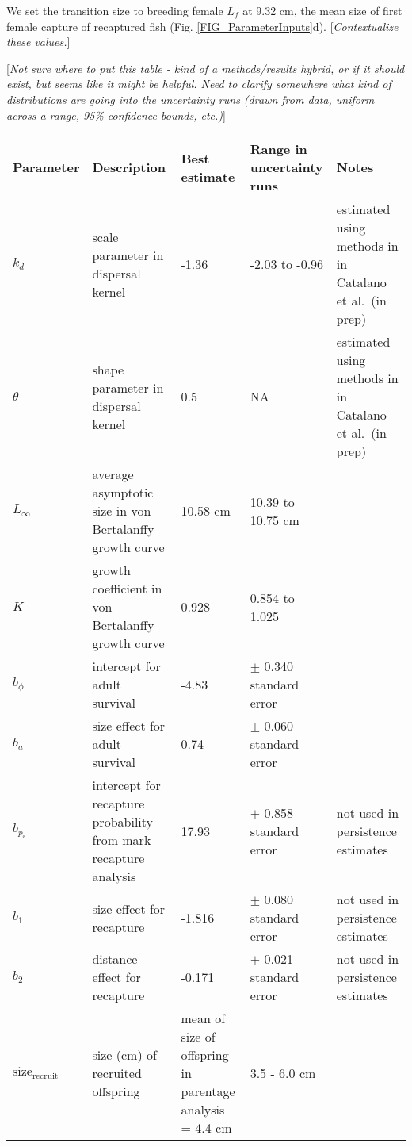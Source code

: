 \documentclass[12pt, oneside]{article}   	%
\begin{document}
We set the transition size to breeding female $L_f$ at 9.32 cm, the mean size of first female capture of recaptured fish (Fig. \ref{FIG_ParameterInputs}d). [\textit{Contextualize these values.}]


[\textit{Not sure where to put this table - kind of a methods/results hybrid, or if it should exist, but seems like it might be helpful. Need to clarify somewhere what kind of distributions are going into the uncertainty runs (drawn from data, uniform across a range, 95\% confidence bounds, etc.)}]
\begin{centering}
\begin{longtable}{|p{0.8in}|p{1.2in}|p{1.5in}|p{1in}|p{1.5in}|}
\hline 
\textbf{Parameter} & \textbf{Description} & \textbf{Best estimate} & \textbf{Range in uncertainty runs} & \textbf{Notes} \\ \hline
$k_d$ & scale parameter in dispersal kernel & -1.36 & -2.03 to -0.96 & estimated using methods in \cite{bode2018estimating} in Catalano et al.\ (in prep) \\ \hline
$\theta$ & shape parameter in dispersal kernel & 0.5 & NA & estimated using methods in \cite{bode2018estimating} in Catalano et al.\ (in prep) \\ \hline
$L_\infty$ & average asymptotic size in von Bertalanffy growth curve & 10.58 cm & 10.39 to 10.75 cm &  \\ \hline
$K$ & growth coefficient in von Bertalanffy growth curve &  0.928 & 0.854 to 1.025 & \\ \hline  
$b_\phi$ & intercept for adult survival & -4.83 & $\pm$ 0.340 standard error & \\ \hline
$b_a$ & size effect for adult survival & 0.74 & $\pm$ 0.060 standard error & \\ \hline
$b_{p_r}$ & intercept for recapture probability from mark-recapture analysis & 17.93 & $\pm$ 0.858 standard error & not used in persistence estimates \\ \hline
$b_1$ & size effect for recapture & -1.816 & $\pm$ 0.080 standard error & not used in persistence estimates \\ \hline
$b_2$ & distance effect for recapture & -0.171 & $\pm$ 0.021 standard error & not used in persistence estimates \\ \hline
$\text{size}_\text{recruit}$ & size (cm) of recruited offspring & mean of size of offspring in parentage analysis = 4.4 cm & 3.5 - 6.0 cm & \\ \hline

\end{longtable}
\end{centering}
\end{document}
